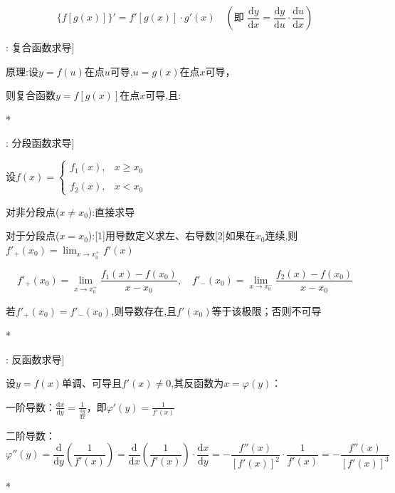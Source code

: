 \documentclass[11pt,a4paper,UTF8]{ctexart}
\begin{document}
\begin{equation*}
\{f[g(x)]\}' = f'[g(x)] \cdot g'(x) \quad \left(\text{即 } \frac{\mathrm{d}y}{\mathrm{d}x} = \frac{\mathrm{d}y}{\mathrm{d}u} \cdot \frac{\mathrm{d}u}{\mathrm{d}x}\right)
\end{equation*}
\begin{thmbox}[原理[5]: 复合函数求导]

原理:设$y=f(u)$在点$u$可导,$u=g(x)$在点$x$可导，

则复合函数$y=f[g(x)]$在点$x$可导,且:


\textit{}*

\end{thmbox}
\begin{thmbox}[原理[6]: 分段函数求导]

设$f(x) = \begin{cases} f_1(x), & x \ge x_0 \\ \\ f_2(x), & x < x_0 \end{cases}$

对非分段点($x \neq x_0$):直接求导

对于分段点($x = x_0$):[1]用导数定义求左、右导数[2]如果在$x_0$连续,则$f'_+(x_0) = \lim_{x \to x_0^+} f'(x)$

  
\begin{equation*}
f'_+(x_0) = \lim_{x \to x_0^+} \frac{f_1(x) - f(x_0)}{x - x_0}, \quad f'_-(x_0) = \lim_{x \to x_0^-} \frac{f_2(x) - f(x_0)}{x - x_0}
\end{equation*}


  若$f'_+(x_0) = f'_-(x_0)$,则导数存在,且$f'(x_0)$等于该极限；否则不可导

\textit{}*

\end{thmbox}
\begin{thmbox}[原理[7]: 反函数求导]

设$y=f(x)$单调、可导且$f'(x) \neq 0$,其反函数为$x=\varphi(y)$：

一阶导数：$\frac{\mathrm{d}x}{\mathrm{d}y} = \frac{1}{\frac{\mathrm{d}y}{\mathrm{d}x}}$，即$\varphi'(y) = \frac{1}{f'(x)}$

二阶导数：
\begin{equation*}
\varphi''(y) = \frac{\mathrm{d}}{\mathrm{d}y}\left(\frac{1}{f'(x)}\right) = \frac{\mathrm{d}}{\mathrm{d}x}\left(\frac{1}{f'(x)}\right) \cdot \frac{\mathrm{d}x}{\mathrm{d}y} = -\frac{f''(x)}{[f'(x)]^2} \cdot \frac{1}{f'(x)} = -\frac{f''(x)}{[f'(x)]^3}
\end{equation*}


\textit{}*

\end{thmbox}
\end{document}
